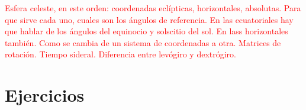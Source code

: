 \begin{Anotacion}
	\textcolor{red}{Esfera celeste, en este orden: coordenadas eclípticas, horizontales, absolutas. Para que sirve cada uno, cuales son los ángulos de referencia. En las ecuatoriales hay que hablar de los ángulos del equinocio y solscitio del sol. En lass horizontales también. Como se cambia de un sistema de coordenadas a otra. Matrices de rotación. Tiempo sideral. Diferencia entre levógiro y dextrógiro. }
\end{Anotacion}	


\section{Ejercicios}


